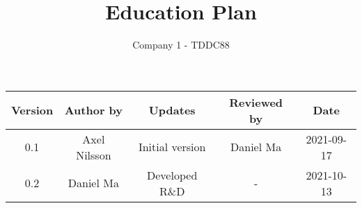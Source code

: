 \documentclass[10pt,a4paper]{article}
\begin{document}
\title{Education Plan} %
\author{Company 1 - TDDC88}
\date{} %
\maketitle %

\begin{table}
\centering
\begin{tabular}{||c c c c c||} 
\hline
Version & Author by & Updates & Reviewed by & Date \\ [0.5ex] 
\hline\hline
0.1 & Axel Nilsson & Initial version & Daniel Ma & 2021-09-17 \\ 
0.2 & Daniel Ma & Developed R\&D & - & 2021-10-13 \\ 
\hline
\end{tabular}
\end{table}



\setcounter{tocdepth}{2}
\tableofcontents


\clearpage






\clearpage



\clearpage
{}

\end{document}
